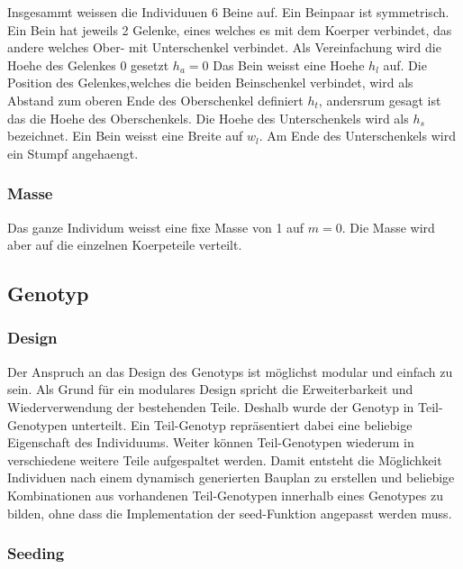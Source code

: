       Insgesammt weissen die Individuuen 6 Beine auf. Ein Beinpaar ist symmetrisch. Ein Bein hat jeweils 2 Gelenke,
      eines welches es mit dem Koerper verbindet,
      das andere welches Ober- mit Unterschenkel verbindet.
      Als Vereinfachung wird die Hoehe des Gelenkes 0 gesetzt  \(h_{a} = 0\)
      Das Bein weisst eine Hoehe \(h_{l}\) auf. Die Position des Gelenkes,welches die beiden Beinschenkel verbindet,
      wird als Abstand zum oberen Ende des Oberschenkel definiert \(h_{t}\),
      andersrum gesagt ist das die Hoehe des Oberschenkels.
      Die Hoehe des Unterschenkels wird als \(h_{s}\) bezeichnet.
      Ein Bein weisst eine Breite auf \(w_{l}\). Am Ende des Unterschenkels wird ein Stumpf angehaengt.

      \subsubsection{Masse\label{subs:Masse}}

        Das ganze Individum weisst eine fixe Masse von 1 auf \(m = 0\).
        Die Masse wird aber auf die einzelnen Koerpeteile verteilt.
        \\
        

    \subsection{Genotyp\label{sub:Genotype}}

      \subsubsection{Design\label{subsub:GenotypeDesign}}

        Der Anspruch an das Design des Genotyps ist möglichst modular und einfach zu sein.
        Als Grund für ein modulares Design spricht die Erweiterbarkeit und Wiederverwendung der bestehenden Teile.
        Deshalb wurde der Genotyp in Teil-Genotypen unterteilt.
        Ein Teil-Genotyp repräsentiert dabei eine beliebige Eigenschaft des Individuums.
        Weiter können Teil-Genotypen wiederum in verschiedene weitere Teile aufgespaltet werden.
        Damit entsteht die Möglichkeit Individuen nach einem dynamisch generierten Bauplan zu erstellen
        und beliebige Kombinationen aus vorhandenen Teil-Genotypen innerhalb eines Genotypes zu bilden,
        ohne dass die Implementation der seed-Funktion angepasst werden muss.

        \subsubsection{Seeding\label{subsub:GenotypeSeeding}}

